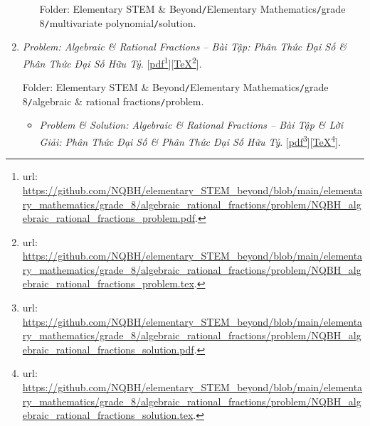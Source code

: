 \documentclass[12pt,oneside]{book}
\begin{document}
\begin{enumerate}
\begin{itemize}
		Folder: {\sf Elementary STEM \& Beyond{\tt/}Elementary Mathematics{\tt/}grade 8{\tt/}multivariate polynomial{\tt/}solution}.
	\end{itemize}
	\item {\it Problem: Algebraic \& Rational Fractions -- Bài Tập: Phân Thức Đại Số \& Phân Thức Đại Số Hữu Tỷ}. [\href{https://github.com/NQBH/elementary_STEM_beyond/blob/main/elementary_mathematics/grade_8/algebraic_rational_fractions/problem/NQBH_algebraic_rational_fractions_problem.pdf}{pdf}\footnote{{\sc url}: \url{https://github.com/NQBH/elementary_STEM_beyond/blob/main/elementary_mathematics/grade_8/algebraic_rational_fractions/problem/NQBH_algebraic_rational_fractions_problem.pdf}.}][\href{https://github.com/NQBH/elementary_STEM_beyond/blob/main/elementary_mathematics/grade_8/algebraic_rational_fractions/problem/NQBH_algebraic_rational_fractions_problem.tex}{\TeX}\footnote{{\sc url}: \url{https://github.com/NQBH/elementary_STEM_beyond/blob/main/elementary_mathematics/grade_8/algebraic_rational_fractions/problem/NQBH_algebraic_rational_fractions_problem.tex}.}].
	
	Folder: {\sf Elementary STEM \& Beyond{\tt/}Elementary Mathematics{\tt/}grade 8{\tt/}algebraic \& rational fractions{\tt/}problem}.
	\begin{itemize}
		\item {\it Problem \& Solution: Algebraic \& Rational Fractions -- Bài Tập \& Lời Giải: Phân Thức Đại Số \& Phân Thức Đại Số Hữu Tỷ}. [\href{https://github.com/NQBH/elementary_STEM_beyond/blob/main/elementary_mathematics/grade_8/algebraic_rational_fractions/problem/NQBH_algebraic_rational_fractions_solution.pdf}{pdf}\footnote{{\sc url}: \url{https://github.com/NQBH/elementary_STEM_beyond/blob/main/elementary_mathematics/grade_8/algebraic_rational_fractions/problem/NQBH_algebraic_rational_fractions_solution.pdf}.}][\href{https://github.com/NQBH/elementary_STEM_beyond/blob/main/elementary_mathematics/grade_8/algebraic_rational_fractions/problem/NQBH_algebraic_rational_fractions_solution.tex}{\TeX}\footnote{{\sc url}: \url{https://github.com/NQBH/elementary_STEM_beyond/blob/main/elementary_mathematics/grade_8/algebraic_rational_fractions/problem/NQBH_algebraic_rational_fractions_solution.tex}.}].
		

\end{itemize}
\end{enumerate}
\end{document}
